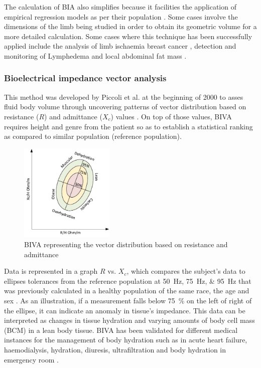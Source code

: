 The calculation of BIA also simplifies because it facilities the application of empirical regression models as per their population \cite{kyle2004bioelectrical}. Some cases involve the dimensions of the limb being studied in order to obtain its geometric volume for a more detailed calculation.  Some cases where this technique has been successfully applied include the analysis of limb ischaemia \cite{songer2001tissue, kun1994tissue} breast cancer \cite{zou2003review}, detection and monitoring of Lymphedema \cite{vicini2012bioelectrical} and local abdominal fat mass \cite{scharfetter2001assessing}. 

\subsubsection{Bioelectrical impedance vector analysis}
This method was developed by Piccoli et al. \cite{piccoli2000relationship, piccoli2002impedance} at the beginning of 2000 to asses fluid body volume through uncovering patterns of vector distribution based on resistance ($R$) and admittance ($X_{c}$) values \cite{thomas2003comparison}. On top of those values, BIVA requires height and genre from the patient so as to establish a statistical ranking as compared to similar population (reference population). 

\begin{figure}[!htpb]
	\centering
	\includegraphics[width=0.4\textwidth,keepaspectratio]{figure13}    
	\caption[BIVA representation]{BIVA representing the vector distribution based on resistance and admittance}
	\label{fig:BIVA plot}
\end{figure}

Data is represented in a graph $R$ vs. $X_{c}$, which compares the subject's data to ellipses tolerances from the reference population at \SIlist{50;75;95}{\hertz} that was previously calculated in a healthy population of the same race, the age and sex \cite{kyle2004bioelectrical,piccoli2000relationship, piccoli2002impedance}. As an illustration, if a measurement falls below \SI{75}{\percent} on the left of right of the ellipse, it can indicate an anomaly in tissue's impedance. This data can be interpreted as changes in tissue hydration and varying amounts of body cell mass (BCM) in a lean body tissue. BIVA has been validated for different medical instances for the management of body hydration such as in acute heart failure, haemodialysis, hydration, diuresis, ultrafiltration and body hydration in emergency room \cite{disomma2011consensus}. 

